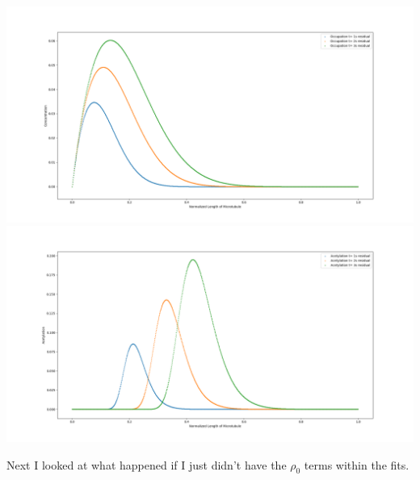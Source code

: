 \documentclass[]{article}
\begin{document}
\includegraphics[width=\linewidth]{OccupationSteadyStateMultiplicationResidual}
\includegraphics[width=\linewidth]{AcetylationSteadyStateMultiplicationResidual}

Next I looked at what happened if I just didn't have the $\rho_0$ terms within the fits.
\end{document}
